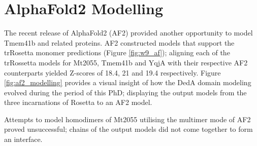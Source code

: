 \section{AlphaFold2 Modelling}
The recent release of AlphaFold2 (AF2) \cite{Jumper2021} provided another opportunity to model Tmem41b and related proteins.  AF2 constructed models that support the trRosetta monomer predictions (Figure \ref{fig:w9_af}); aligning each of the trRossetta models for Mt2055, Tmem41b and YqjA with their respective AF2 counterparts yielded Z-scores of 18.4, 21 and 19.4 respectively.  Figure \ref{fig:af2_modelling} provides a visual insight of how the DedA domain modeling evolved during the period of this PhD; displaying the output models from the three incarnations of Rosetta to an AF2 model. 

Attempts to model homodimers of Mt2055 utilising the multimer mode of AF2 proved unsuccessful; chains of the output models did not come together to form an interface.  


